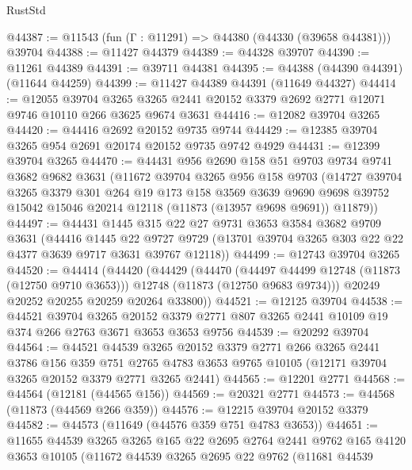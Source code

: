 \begin{lexlean}{RustStd}
\begin{coremodule}
@44387 := @11543 (fun (Γ : @11291) => @44380 (@44330 (@39658 @44381))) @39704
@44388 := @11427 @44379
@44389 := @44328 @39707
@44390 := @11261 @44389
@44391 := @39711 @44381
@44395 := @44388 (@44390 @44391) (@11644 @44259)
@44399 := @11427 @44389 @44391 (@11649 @44327)
@44414 := @12055
    @39704
    @3265
    @3265
    @2441
    @20152
    @3379
    @2692
    @2771
    @12071
    @9746
    @10110
    @266
    @3625
    @9674
    @3631
@44416 := @12082 @39704 @3265
@44420 := @44416 @2692 @20152 @9735 @9744
@44429 := @12385 @39704 @3265 @954 @2691 @20174 @20152 @9735 @9742 @4929
@44431 := @12399 @39704 @3265
@44470 := @44431
    @956
    @2690
    @158
    @51
    @9703
    @9734
    @9741
    @3682
    @9682
    @3631
    (@11672
      @39704
      @3265
      @956
      @158
      @9703
      (@14727
        @39704
        @3265
        @3379
        @301
        @264
        @19
        @173
        @158
        @3569
        @3639
        @9690
        @9698
        @39752
        @15042
        @15046
        @20214
        @12118
        (@11873 (@13957 @9698 @9691))
        @11879))
@44497 := @44431
    @1445
    @315
    @22
    @27
    @9731
    @3653
    @3584
    @3682
    @9709
    @3631
    (@44416
      @1445
      @22
      @9727
      @9729
      (@13701 @39704 @3265 @303 @22 @22 @4377 @3639 @9717 @3631 @39767 @12118))
@44499 := @12743 @39704 @3265
@44520 := @44414
    (@44420
      (@44429
        (@44470
          (@44497 @44499 @12748 (@11873 (@12750 @9710 @3653)))
          @12748
          (@11873 (@12750 @9683 @9734)))
        @20249
        @20252
        @20255
        @20259
        @20264
        @33800))
@44521 := @12125 @39704
@44538 := @44521
    @39704
    @3265
    @20152
    @3379
    @2771
    @807
    @3265
    @2441
    @10109
    @19
    @374
    @266
    @2763
    @3671
    @3653
    @3653
    @9756
@44539 := @20292 @39704
@44564 := @44521
    @44539
    @3265
    @20152
    @3379
    @2771
    @266
    @3265
    @2441
    @3786
    @156
    @359
    @751
    @2765
    @4783
    @3653
    @9765
    @10105
    (@12171 @39704 @3265 @20152 @3379 @2771 @3265 @2441)
@44565 := @12201 @2771
@44568 := @44564 (@12181 (@44565 @156))
@44569 := @20321 @2771
@44573 := @44568 (@11873 (@44569 @266 @359))
@44576 := @12215 @39704 @20152 @3379
@44582 := @44573 (@11649 (@44576 @359 @751 @4783 @3653))
@44651 := @11655
    @44539
    @3265
    @3265
    @165
    @22
    @2695
    @2764
    @2441
    @9762
    @165
    @4120
    @3653
    @10105
    (@11672
      @44539
      @3265
      @2695
      @22
      @9762
      (@11681
        @44539

\end{coremodule}
\end{lexlean}
